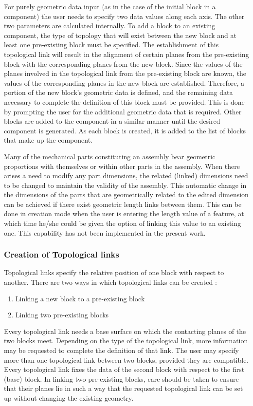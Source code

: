 		For purely geometric data input (as in the case of the initial block in
		a component) the user needs to specify two data values along each axis.
		The other two parameters are calculated internally. To add a block to 
		an existing component, the type of topology that will exist between the 		new block and at least one pre-existing block must be specified. 
		The establishment of this 
		topological link will result in the alignment of certain planes from
		the pre-existing block with the corresponding planes from the new block.
		Since the values of the planes involved in the topological link from the
		pre-existing block are known, the values of the corresponding planes
		in the new block are established. Therefore, a portion of the new 
		block's geometric data is defined, and the remaining data necessary to 
		complete the definition of this block must be provided. 
		This is done by prompting the user for the additional geometric data
		that is required.  Other blocks are added
		to the component in a similar manner until the desired component is
		generated. As each block is created, it is added to the list of blocks
		that make up the component.

		Many of the mechanical parts constituting an assembly bear geometric
		proportions with themselves or within other parts in the assembly. When
		there arises a need to modify any part dimensions, the related
		(linked) dimensions need to be changed to maintain the validity of the
		assembly. This automatic change in the dimensions of the parts that are
		geometrically related to the edited dimension can be achieved if there
		exist geometric length links between them. This 
		can be done in creation mode when the user is entering the length value
		of a feature, at which time he/she could be given the option of 
		linking this value to an existing one.
		This capability has not been implemented in the present work.

		\subsubsection{Creation of Topological links}

		Topological links specify the relative position of one block with
		respect to another.
		There are two ways in which topological links can be created :
		\begin{enumerate}
		\item
		Linking a new block to a pre-existing block
		\item
		Linking two pre-existing blocks
		\end{enumerate}
		Every topological link needs a base surface on which
		the contacting planes of the two blocks meet. Depending on the type of
		the topological link, more information may be requested to complete the
		definition of that link. The user may specify more than one topological
 		link between two blocks, provided they are compatible.
		Every topological link fixes the data of the second block with respect 
		to the first (base) block. In linking two pre-existing blocks, care 
		should be taken to ensure that their planes lie in such a way that 
		the requested
		topological link can be set up without changing the existing geometry.

